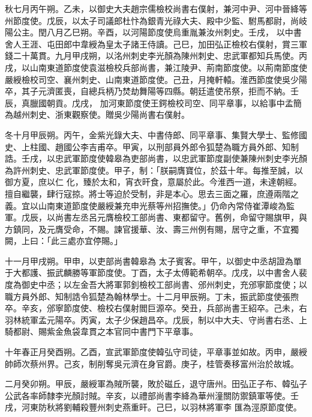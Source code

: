 \begin{pinyinscope}
 秋七月丙午朔。乙未，以御史大夫趙宗儒檢校尚書右僕射，兼河中尹、河中晉絳等州節度使。戊辰，以太子司議郎杜忭為銀青光祿大夫、殿中少監、駙馬都尉，尚岐陽公主。閏八月乙巳朔。辛酉，以河陽節度使烏重胤兼汝州刺史。壬戌，
 以中書舍人王涯、屯田郎中韋綬為皇太子諸王侍讀。己巳，加田弘正檢校右僕射，賞三軍錢二十萬貫。九月甲戌朔，以洺州刺史李光顏為陳州刺史、忠武軍都知兵馬使。丙戌，以山南東道節度使袁滋檢校兵部尚書，兼江陵尹、荊南節度使。以荊南節度使嚴綬檢校司空、襄州刺史、山南東道節度使。己丑，月掩軒轅。淮西節度使吳少陽卒，其子元濟匿喪，自總兵柄乃焚劫舞陽等四縣。朝廷遣使吊祭，拒而不納。壬辰，真臘國朝貢。戊戌，
 加河東節度使王鍔檢校司空、同平章事，以給事中孟簡為越州刺史、浙東觀察使。贈吳少陽尚書右僕射。



 冬十月甲辰朔。丙午，金紫光錄大夫、中書侍郎、同平章事、集賢大學士、監修國史、上柱國、趙國公李吉甫卒。甲寅，以刑部員外郎令狐楚為職方員外郎、知制誥。壬戌，以忠武軍節度使韓皋為吏部尚書，以忠武軍節度副使兼陳州刺史李光顏為許州刺史、忠武軍節度使。甲子，制：「朕嗣膺寶位，於茲十年。每推至誠，以御方夏，庶以仁
 化，臻於太和，宵衣旰食，意屬於此。今淮西一道，未達朝經。擅自繼襲，肆行寇掠。將士等迫於受制，非是本心。思去三面之羅，庶遵兩階之義。宜以山南東道節度使嚴綬兼充申光蔡等州招撫使。」仍命內常侍崔潭峻為監軍。戊辰，以尚書左丞呂元膺檢校工部尚書、東都留守。舊例，命留守賜旗甲，與方鎮同，及元膺受命，不賜。諫官援華、汝、壽三州例有賜，居守之重，不宜獨闕，上曰：「此三處亦宜停賜。」



 十一月甲戌朔。甲申，以吏部尚書韓皋為
 太子賓客。甲午，以御史中丞胡證為單于大都護、振武麟勝等軍節度使。丁酉，太子太傅範希朝卒。戊戌，以中書舍人裴度為御史中丞；以左金吾大將軍郭釗檢校工部尚書、邠州刺史，充邠寧節度使；以職方員外郎、知制誥令狐楚為翰林學士。十二月甲辰朔。丁未，振武節度使張煦卒。辛亥，邠寧節度使、檢校右僕射閻巨源卒。癸丑，兵部尚書王紹卒。己未，右羽林統軍孟元陽卒。丙寅，太子少保趙昌卒。戊辰，制以中大夫、守尚書右丞、上
 騎都尉、賜紫金魚袋韋貫之本官同中書門下平章事。



 十年春正月癸酉朔。乙酉，宣武軍節度使韓弘守司徒，平章事並如故。丙申，嚴綬帥師次蔡州界。己亥，制削奪吳元濟在身官爵。庚子，桂管奏移富州治於故城。



 二月癸卯朔。甲辰，嚴綬軍為賊所襲，敗於磁丘，退守唐州。田弘正子布、韓弘子公武各率師隸李光顏討賊。辛亥，以禮部尚書李絳為華州潼關防禦鎮軍等使。壬戌，河東防秋將劉輔殺豐州刺史燕重旰。己巳，以羽林將軍李
 匯為涇原節度使。




\end{pinyinscope}
